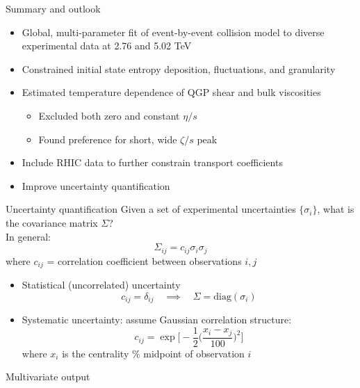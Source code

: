 \documentclass{beamer}
\begin{document}
\begin{frame}{Summary and outlook}
  \begin{itemize}
    \item Global, multi-parameter fit of event-by-event collision model to diverse experimental data at 2.76 and 5.02 TeV
    \item Constrained initial state entropy deposition, fluctuations, and granularity
    \item Estimated temperature dependence of QGP shear and bulk viscosities
      \begin{itemize}
        \item Excluded both zero and constant $\eta/s$
        \item Found preference for short, wide $\zeta/s$ peak
      \end{itemize}
  \end{itemize}
  \begin{itemize}
    \item Include RHIC data to further constrain transport coefficients
    \item Improve uncertainty quantification
  \end{itemize}
\end{frame}


\appendix


\begin{frame}{Uncertainty quantification}
  Given a set of experimental uncertainties $\{\sigma_i\}$, what is the covariance matrix $\Sigma$? \\[.5ex]
  In general:
  \begin{equation*}
    \Sigma_{ij} = c_{ij} \sigma_i \sigma_j
  \end{equation*}
  where $c_{ij}$ = correlation coefficient between observations $i,j$
  \begin{itemize}
    \item Statistical (uncorrelated) uncertainty
      \begin{equation*}
        c_{ij} = \delta_{ij} \quad\implies\quad \Sigma = \text{diag}(\sigma_i)
      \end{equation*}
    \item Systematic uncertainty: assume Gaussian correlation structure:
      \begin{equation*}
        c_{ij} = \exp\Biggl[ -\frac{1}{2} \biggl( \frac{x_i - x_j}{100} \biggr)^2 \Biggr]
      \end{equation*}
      where $x_i$ is the centrality \% midpoint of observation $i$
  \end{itemize}
\end{frame}

\begin{frame}{Multivariate output}

\end{frame}
\end{document}
